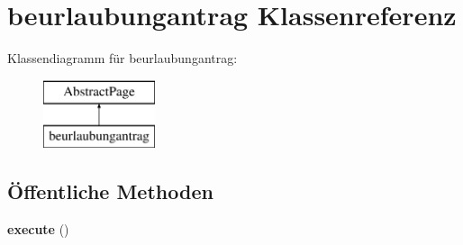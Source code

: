 \hypertarget{classbeurlaubungantrag}{}\section{beurlaubungantrag Klassenreferenz}
\label{classbeurlaubungantrag}
Klassendiagramm für beurlaubungantrag\+:\begin{figure}[H]
\begin{center}
\leavevmode
\includegraphics[height=2.000000cm]{classbeurlaubungantrag}
\end{center}
\end{figure}
\subsection*{Öffentliche Methoden}
\begin{DoxyCompactItemize}
\item 
\mbox{\label{classbeurlaubungantrag_a6e6b7692233a48d33629a1910a894f78}} 
{\bfseries execute} ()
\end{DoxyCompactItemize}
